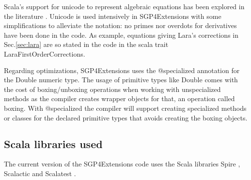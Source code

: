 \documentclass{article}
\begin{document}
Scala's support for unicode to represent algebraic equations has been explored in the literature \cite{DBLP:journals/corr/abs-1112-1751}. Unicode is used intensively in SGP4Extensions with some simplifications to alleviate the notation: no primes nor overdots for derivatives have been done in the code.
As example, equations giving Lara's corrections in Sec.\ref{sec:lara} are so stated in the code in the scala trait LaraFirstOrderCorrections.
%
%


Regarding optimizations, SGP4Extensions uses the @specialized annotation for the Double numeric type. The usage of primitive types like Double comes with the cost of boxing/unboxing operations when working with unspecialized methods as the compiler creates wrapper objects for that, an operation called boxing. With @specialized the compiler will support creating specialized methods or classes for the declared primitive types that avoids creating the boxing objects.


\subsection{Scala libraries used}
\label{sec:libraries}

The current version of the SGP4Extensions code uses the Scala libraries Spire \cite{Spire2011}, Scalactic \cite{Scalactic2015} and Scalatest \cite{Scalatest2009}.
\end{document}
